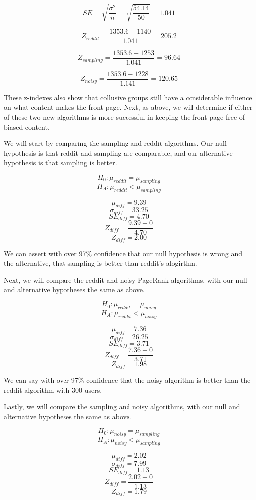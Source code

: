 \documentclass[12pt, oneside]{amsart}
\begin{document}
$$SE = \sqrt{\frac{\sigma^2}{n}} = \sqrt{\frac{54.14}{50}} = 1.041$$

$$Z_{reddit} = \frac{1353.6 - 1140}{1.041} = 205.2$$

$$Z_{sampling} = \frac{1353.6 - 1253}{1.041} = 96.64$$

$$Z_{noisy} = \frac{1353.6 - 1228}{1.041} = 120.65$$

These z-indexes also show that collusive groups still have a considerable influence on what content makes the front page.  Next, as above, we will determine if either of these two new algorithms is more successful in keeping the front page free of biased content.

We will start by comparing the sampling and reddit algorithms.  Our null hypothesis is that reddit and sampling are comparable, and our alternative hypothesis is that sampling is better.

$$H_0: \mu_{reddit} = \mu_{sampling}$$
$$H_A: \mu_{reddit} < \mu_{sampling}$$

$$\mu_{diff} = 9.39$$
$$\sigma_{diff} = 33.25$$
$$SE_{diff} = 4.70$$
$$Z_{diff} = \frac{9.39 - 0}{4.70}$$
$$Z_{diff} = 2.00$$

We can assert with over 97\% confidence that our null hypothesis is wrong and the alternative, that sampling is better than reddit's alogirthm.

\vspace{.2cm}

Next, we will compare the reddit and noisy PageRank algorithms, with our null and alternative hypotheses the same as above.

$$H_0: \mu_{reddit} = \mu_{noisy}$$
$$H_A: \mu_{reddit} < \mu_{noisy}$$

$$\mu_{diff} = 7.36$$
$$\sigma_{diff} = 26.25$$
$$SE_{diff} = 3.71$$
$$Z_{diff} = \frac{7.36 - 0}{3.71}$$
$$Z_{diff} = 1.98$$

We can say with over 97\% confidence that the noisy algorithm is better than the reddit algorithm with 300 users.

\vspace{.2cm}

Lastly, we will compare the sampling and noisy algorithms, with our null and alternative hypotheses the same as above.

$$H_0: \mu_{noisy} = \mu_{sampling}$$
$$H_A: \mu_{noisy} < \mu_{sampling}$$

$$\mu_{diff} = 2.02$$
$$\sigma_{diff} = 7.99$$
$$SE_{diff} = 1.13$$
$$Z_{diff}  = \frac{2.02 - 0}{1.13}$$
$$Z_{diff} = 1.79$$
\end{document}
